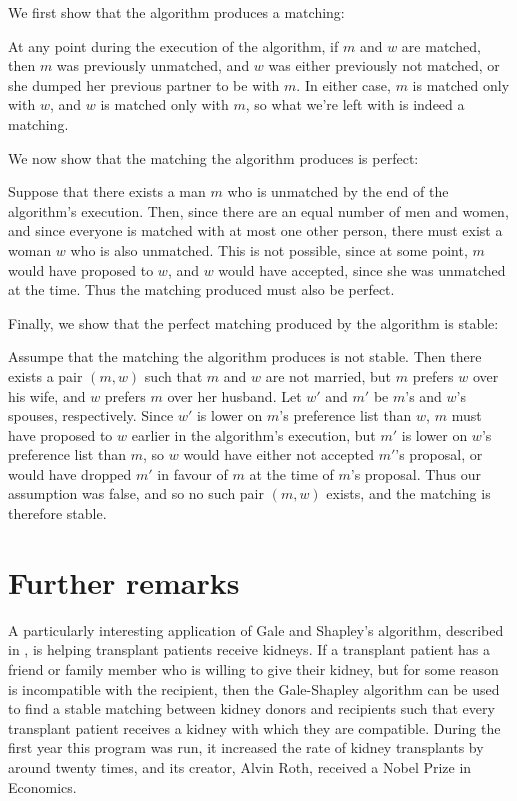\documentclass[11pt]{article}
\begin{document}
\noindent
We first show that the algorithm produces a matching:
\newline

At any point during the execution of the algorithm, if $m$ and $w$ are matched,
then $m$ was previously unmatched, and $w$ was either previously not matched,
or she dumped her previous partner to be with $m$. In either case, $m$ is
matched only with $w$, and $w$ is matched only with $m$, so what we're left
with is indeed a matching.
\newline

\noindent
We now show that the matching the algorithm produces is perfect:
\newline

Suppose that there exists a man $m$ who is unmatched by the end of the
algorithm's execution. Then, since there are an equal number of men and women,
and since everyone is matched with at most one other person, there must exist a
woman $w$ who is also unmatched. This is not possible, since at some point, $m$
would have proposed to $w$, and $w$ would have accepted, since she was
unmatched at the time. Thus the matching produced must also be perfect.
\newline

\noindent
Finally, we show that the perfect matching produced by the algorithm is stable:
\newline

Assumpe that the matching the algorithm produces is not stable. Then there
exists a pair $(m,w)$ such that $m$ and $w$ are not married, but $m$ prefers
$w$ over his wife, and $w$ prefers $m$ over her husband. Let $w'$ and $m'$
be $m$'s and $w$'s spouses, respectively. Since $w'$ is lower on $m$'s
preference list than $w$, $m$ must have proposed to $w$ earlier in the
algorithm's execution, but $m'$ is lower on $w$'s preference list than $m$, so
$w$ would have either not accepted $m'$'s proposal, or would have dropped $m'$
in favour of $m$ at the time of $m$'s proposal. Thus our assumption was false,
and so no such pair $(m,w)$ exists, and the matching is therefore stable.
\cite{Kleinberg}



\section{Further remarks}
A particularly interesting application of Gale and Shapley's algorithm,
described in \cite{Kidney}, is helping transplant patients receive kidneys. If
a transplant patient has a friend or family member who is willing to give their
kidney, but for some reason is incompatible with the recipient, then the
Gale-Shapley algorithm can be used to find a stable matching between kidney
donors and recipients such that every transplant patient receives a kidney
with which they are compatible. During the first year this program was run, it
increased the rate of kidney transplants by around twenty times, and its
creator, Alvin Roth, received a Nobel Prize in Economics.




\end{document}

